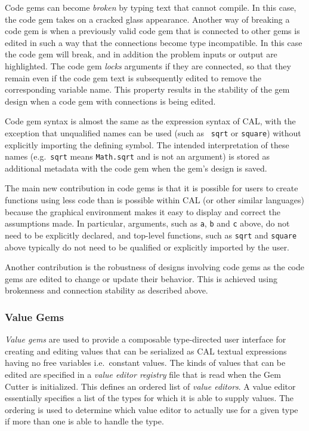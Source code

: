 \documentclass[preprint]{sigplanconf}
\begin{document}
Code gems can become {\it broken} by typing text that cannot
compile. In this case, the code gem takes on a cracked glass appearance.
Another way of breaking a code gem is when a previously
valid code gem that is connected to other gems is edited in such a way
that the connections become type incompatible. In this case the code
gem will break, and in addition the problem inputs or output are
highlighted. The code gem {\it locks} arguments if they are
connected, so that they remain even if the code gem text is subsequently edited to remove
the corresponding variable name. This property results in the
stability of the gem design when a code gem with
connections is being edited.
 
Code gem syntax is almost the same as the expression syntax of CAL,
with the exception that unqualified names can be used (such as {\tt
sqrt} or {\tt square}) without explicitly importing the defining
symbol. The intended interpretation of these names (e.g.\ {\tt sqrt} means
{\tt Math.sqrt} and is not an argument) is stored as additional
metadata with the code gem when the gem's design is saved.

The main new contribution in code gems is that it is possible for
users to create functions using less code than is possible within CAL
(or other similar languages) because the graphical environment makes it
easy to display and correct the assumptions made. In particular,
arguments, such as {\tt a}, {\tt b} and {\tt c} above, do not need to
be explicitly declared, and top-level functions, such as {\tt sqrt}
and {\tt square} above typically do not need to be qualified or
explicitly imported by the user. 

Another contribution is the robustness of designs involving code gems
as the code gems are edited to change or update their behavior.
This is achieved using brokenness and connection stability as described
above.

\subsubsection{Value Gems}
\label{sec:valueGems}

{\it Value gems} are used to provide a composable type-directed user
interface for creating and editing values that can be serialized as CAL textual
expressions having no free variables i.e.\ constant values. The kinds of
values that can be edited are specified in a {\it value editor registry}
file that is read when the Gem Cutter is initialized. This defines
an ordered list of {\it value editors}. A value editor essentially
specifies a list of the types for which it is able to supply values.
The ordering is used to determine which value editor to actually use
for a given type if more than one is able to handle the type.
\end{document}
